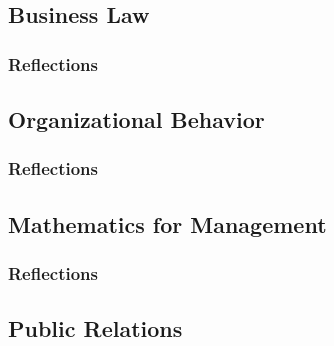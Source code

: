 \documentclass[12pt,titlepage]{article}
\begin{document}
\subsection{Business Law}
\subsubsection{Reflections}

\subsection{Organizational Behavior}
\subsubsection{Reflections}


\restoregeometry




\subsection{Mathematics for Management}
\subsubsection{Reflections}


\restoregeometry


\subsection{Public Relations}
\end{document}
